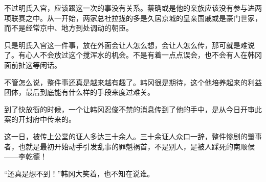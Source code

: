 不过明氏入宫，应该跟这一次的事没有关系。蔡确或是他的亲族应该没有参与进两项联赛之中。从一开始，两家总社拉拢的多是久居京城的皇亲国戚或是豪门世家，而不是经常京中、地方到处调动的朝臣。

只是明氏入宫这一件事，放在外面会让人怎么想，会让人怎么传，那可就是难说了。有心人不会放过这个搅浑水的机会。不是有着一点点误会，也不会有人在韩冈面前扯这等闲话。

不管怎么说，整件事还真是越来越有趣了。韩冈很是期待，这个他培养起来的利益团体，最后到底能有什么样的手段来度过难关。

到了快放衙的时候，一个让韩冈忍俊不禁的消息传到了他的手中，是从今日开审此案的开封府中传来的。

这一日，被传上公堂的证人多达三十余人。三十余证人众口一辞，整件惨剧的肇事者，也就是最初开始动手引发乱事的罪魁祸首，不是别人，是被人踩死的南顺侯——李乾德！

“还真是想不到！”韩冈大笑着，也不知在说谁。

